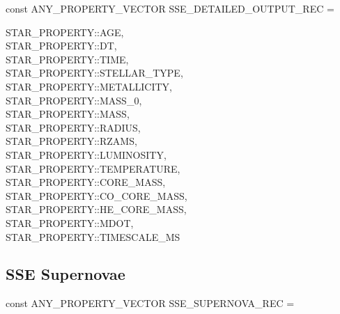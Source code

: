 const ANY\_PROPERTY\_VECTOR SSE\_DETAILED\_OUTPUT\_REC = \lcb

\hfill
\begin{minipage}{\dimexpr\textwidth-2em}
    STAR\_PROPERTY::AGE, \\
    STAR\_PROPERTY::DT, \\
    STAR\_PROPERTY::TIME, \\
    STAR\_PROPERTY::STELLAR\_TYPE, \\
    STAR\_PROPERTY::METALLICITY, \\
    STAR\_PROPERTY::MASS\_0, \\
    STAR\_PROPERTY::MASS, \\
    STAR\_PROPERTY::RADIUS, \\
    STAR\_PROPERTY::RZAMS, \\
    STAR\_PROPERTY::LUMINOSITY, \\
    STAR\_PROPERTY::TEMPERATURE, \\
    STAR\_PROPERTY::CORE\_MASS, \\
    STAR\_PROPERTY::CO\_CORE\_MASS, \\
    STAR\_PROPERTY::HE\_CORE\_MASS, \\
    STAR\_PROPERTY::MDOT, \\
    STAR\_PROPERTY::TIMESCALE\_MS
\end{minipage}
\par\rcb{;}

\newpage
\subsection{SSE Supernovae}\label{sec:SSESupernovae}

const ANY\_PROPERTY\_VECTOR SSE\_SUPERNOVA\_REC = \lcb

